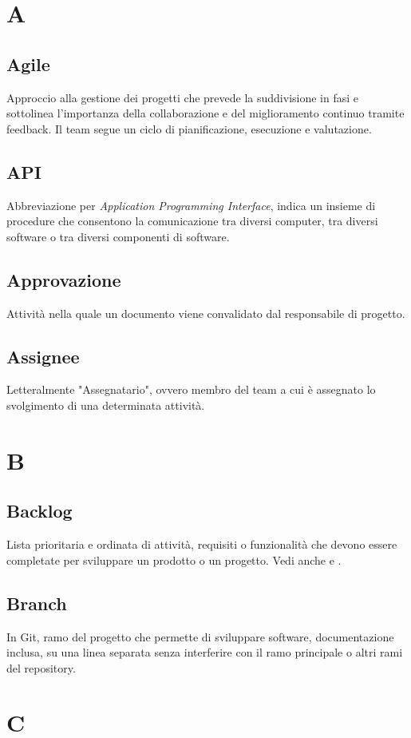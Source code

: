 \section{A}
    \subsection{Agile}
    Approccio alla gestione dei progetti che prevede la suddivisione in fasi e sottolinea 
    l'importanza della collaborazione e del miglioramento continuo tramite feedback. 
    Il team segue un ciclo di pianificazione, esecuzione e valutazione.
    \subsection{API}
    Abbreviazione per \textit{Application Programming Interface}, indica un insieme di 
    procedure che consentono la comunicazione tra diversi computer, tra diversi 
    software o tra diversi componenti di software.
    \subsection{Approvazione}
    Attività nella quale un documento viene convalidato dal responsabile di progetto.
    \subsection{Assignee}
    Letteralmente "Assegnatario", ovvero membro del team a cui è assegnato lo
    svolgimento di una determinata attività.
\pagebreak
\section{B}
    \subsection{Backlog}
    Lista prioritaria e ordinata di attività, requisiti o funzionalità che devono 
    essere completate per sviluppare un prodotto o un progetto.
    Vedi anche  e .
    \subsection{Branch} 
    In Git, ramo del progetto che permette di sviluppare software, documentazione inclusa, su una linea separata 
    senza interferire con il ramo principale o altri rami del repository.
\pagebreak
\section{C}
